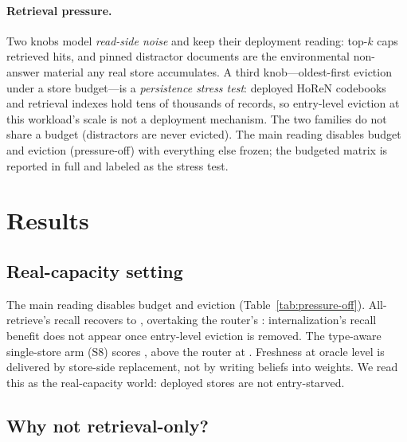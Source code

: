 \documentclass{article}
\begin{document}
\paragraph{Retrieval pressure.} Two knobs model \emph{read-side noise} and keep their deployment reading: top-$k$ caps retrieved hits, and pinned distractor documents are the environmental non-answer material any real store accumulates. A third knob---oldest-first eviction under a store budget---is a \emph{persistence stress test}: deployed HoReN codebooks and retrieval indexes hold tens of thousands of records, so entry-level eviction at this workload's scale is not a deployment mechanism. The two families do not share a budget (distractors are never evicted). The main reading disables budget and eviction (pressure-off) with everything else frozen; the budgeted matrix is reported in full and labeled as the stress test.

\section{Results}
\label{sec:results}

\subsection{Real-capacity setting}
\label{sec:results-pressure}

The main reading disables budget and eviction (Table~\ref{tab:pressure-off}). All-retrieve's recall recovers to \SoneOffRecall, overtaking the router's \SfiveOffRecall: internalization's recall benefit does not appear once entry-level eviction is removed. The type-aware single-store arm (S8) scores \SeightOffComp, above the router at \SfiveOffComp. Freshness at oracle level is delivered by store-side replacement, not by writing beliefs into weights. We read this as the real-capacity world: deployed stores are not entry-starved.

\subsection{Why not retrieval-only?}
\label{sec:results-s8}
\end{document}
